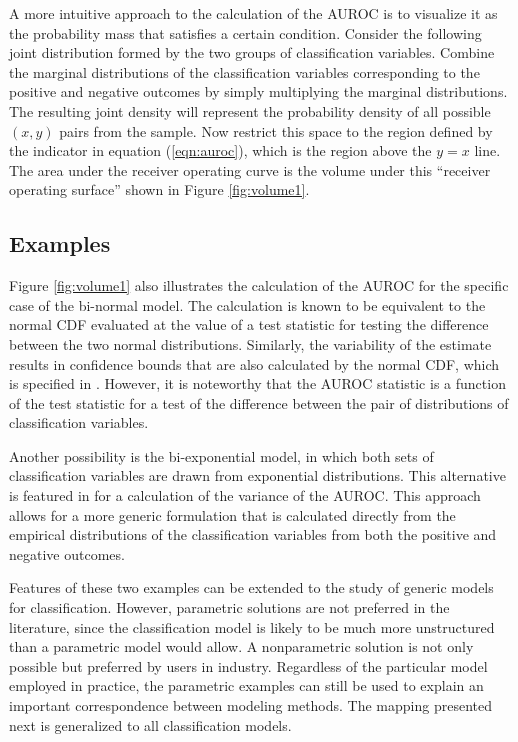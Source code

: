 A more intuitive approach to the calculation of the AUROC is to visualize it as the probability mass that satisfies a certain condition.
Consider the following joint distribution formed by the two groups of classification variables.
Combine the marginal distributions of the classification variables corresponding to the positive and negative outcomes by simply multiplying the marginal distributions.
The resulting joint density will represent the probability density of all possible $(x,y)$ pairs from the sample.
Now restrict this space to the region defined by the indicator in equation (\ref{eqn:auroc}), which is the region above the $y = x$ line.
The area under the receiver operating curve is the volume under this ``receiver operating surface'' shown in Figure \ref{fig:volume1}.


% 




\subsection{Examples}


Figure \ref{fig:volume1} also illustrates the calculation of the AUROC for the specific case of the bi-normal model.
The calculation is known to be equivalent to the normal CDF evaluated at the value of a test statistic for testing the difference between the two normal distributions.
Similarly, the variability of the estimate results in confidence bounds that are also calculated by the normal CDF, which is specified in \citet{demidenko2012}.
However, it is noteworthy that the AUROC statistic is a function of the test statistic for a test of the difference between the pair of distributions of classification variables.
%


Another possibility is the bi-exponential model, in which both sets of classification variables are drawn from exponential distributions.
%
This alternative is featured in \citet{hanleymcneil1982} for a calculation of the variance of the AUROC.
This approach allows for a more generic formulation that is calculated directly from the empirical distributions of the classification variables from both the positive and negative outcomes.
%

Features of these two examples can be extended to the study of generic models for classification.
However, parametric solutions are not preferred in the literature, since the classification model is likely to be much more unstructured than a parametric model would allow.
A nonparametric solution is not only possible but preferred by users in industry.
Regardless of the particular model employed in practice, the parametric examples can still be used to explain an important correspondence between modeling methods.
The mapping presented next is generalized to all classification models.

